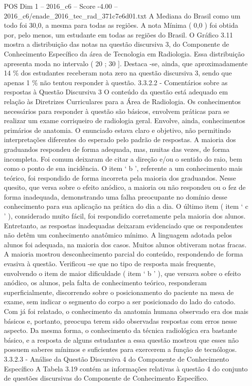 \begin{textsample}{POS Dim 1 – 2016\_c6 – Score -4.00 – 2016\_c6/enade\_2016\_tec\_rad\_371c7e6d01.txt}
A Mediana do Brasil como um todo foi 30,0, a mesma para todas as regiões.
A nota Mínima ( 0,0 ) foi obtida por, pelo menos, um estudante em todas as regiões do Brasil.
O Gráfico 3.11 mostra a distribuição das notas na questão discursiva 3, do Componente de Conhecimento Específico da área de Tecnologia em Radiologia.
Essa distribuição apresenta moda no intervalo ( 20 ; 30 ].
Destaca -se, ainda, que aproximadamente 14 \% dos estudantes receberam nota zero na questão discursiva 3, sendo que apenas 1 \% não tentou responder à questão. 3.3.2.2 - Comentários sobre as respostas à Questão Discursiva 3 O conteúdo da questão está adequado em relação às Diretrizes Curriculares para a Área de Radiologia.
Os conhecimentos necessários para responder à questão são básicos, envolvem práticas para se realizar um exame corriqueiro de radiologia geral.
Envolve, ainda, conhecimentos primários de anatomia.
O enunciado estava claro e objetivo, não permitindo interpretações diferentes do esperado pelo padrão de respostas.
A maioria dos graduandos respondeu de forma adequada, mas, muitas das vezes, de forma incompleta.
Foi comum deixaram de citar a direção e/ou o sentido do raio, bem como o ponto de sua incidência.
O item ‘ b ’, referente a um conhecimento mais teórico, foi respondido de forma incorreta pela maioria dos graduandos.
Nesse quesito, que versa sobre o efeito anódico, a maioria ou não respondeu ou o fez de forma inadequada, demonstrando uma falha preocupante no domínio desse conhecimento para sua aplicação na prática do dia a dia.
O último item ( item ‘ c ’ ), considerado muito fácil, foi respondido corretamente pela maioria dos alunos.
Entretanto, as respostas inadequadas deixaram evidenciado que os respondentes não detêm um conhecimento anatômico mínimo.
A linguagem adotada pelos alunos foi adequada, na maioria dos casos.
Muitos alunos obtiveram notas fracas.
A maioria mostrou desconhecimento parcial do conteúdo, respondendo de forma evasiva à questão.
Verificou -se que no tipo de resposta mais frequente, envolvendo o item de maior dificuldade ( item ‘ b ’ ), que versava sobre o efeito anódico, os alunos, pela falta de conhecimento teórico, responderam superficialmente, discorrendo sobre o posicionamento do paciente na mesa de exame, sem indicar o segmento do corpo a ser posicionado do lado do catodo.
Com já foi relatado, o conhecimento da anatomia humana observado era dos mais básicos e, portanto, preocupa terem sido observadas respostas com erros nesse aspecto.
Da mesma forma, o conhecimento da técnica radiológica era bastante básico, e a resposta de alguns estudantes a essa questão mostrou que esses não possuem saberes mínimos e suficientes para exercerem a função de tecnólogos. 3.3.2.3 - Análise da Questão Discursiva 4 do Componente de Conhecimento Específico A Tabela 3.19 contém as informações relativas à questão 4 do conjunto de questões discursivas do Componente de Conhecimento Específico.

\end{textsample}
